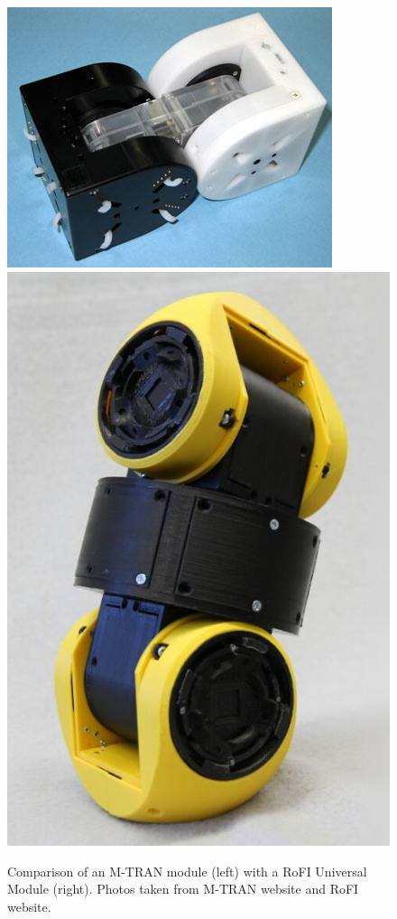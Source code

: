 \documentclass[
  printed, %
  color,   %
  notable, %
  oneside, %
  nolof,   %
  nolot,   %
  nocover,
]{fithesis3}
\begin{document}
\begin{figure}
    \centering
    \includegraphics[height=.3\textheight]{data/mtran3.jpg}
    \includegraphics[height=.4\textheight]{data/rofi_universal_module.jpg}
    \caption{Comparison of an M-TRAN module (left) with a RoFI Universal Module (right). Photos taken from M-TRAN website\cite{mtran-web} and RoFI website\cite{rofi-web}.}
    \label{fig:mtran-rofi}
\end{figure}
\end{document}
